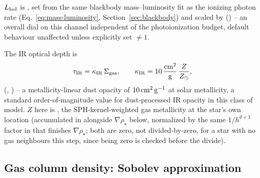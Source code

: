 $L_{\rm bol}$ is , set from
the same blackbody mass--luminosity fit as the ionizing photon rate
(Eq.~\ref{eq:mass-luminosity}, Section~\ref{sec:blackbody}) and scaled
by  () --
an overall dial on this channel independent of the photoionization
budget, default behaviour unaffected unless explicitly set $\ne1$.

The IR optical depth is
\begin{equation}
  \tau_{\rm IR} = \kappa_{\rm IR}\,\Sigma_{\rm gas}, \qquad
  \kappa_{\rm IR} = 10\,\frac{\rm cm^2}{\rm g}\,\frac{Z}{Z_\odot},
  \label{eq:rp-tauIR}
\end{equation}
(,
) -- a metallicity-linear
dust opacity of $10\,{\rm cm^2\,g^{-1}}$ at solar metallicity, a
standard order-of-magnitude value for dust-processed IR opacity in this
class of model. $Z$ here is , the
SPH-kernel-weighted gas metallicity at the star's own location
(accumulated in 
alongside $\nabla\rho_\star$ below, normalized by the same
$1/h^{d+1}$ factor in 
that finishes $\nabla\rho_\star$; both are zero, not divided-by-zero,
for a star with no gas neighbours this step, since
 being zero is checked before the divide).

\subsection{Gas column density: Sobolev approximation}
\label{sec:rp-sobolev}

